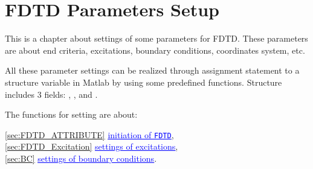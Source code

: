 \chapter{FDTD Parameters Setup}\label{chap:FDTD Parameter Setup}
This is a chapter about settings of some parameters for FDTD. These parameters are about end criteria, excitations, boundary conditions, coordinates system, etc.

All these parameter settings can be realized through assignment statement to a structure variable  in Matlab by using some predefined functions.
Structure   \label{para:FDTD} includes 3 fields:
, \label{para:ATTRIBUTE}
, \label{para:Excitation}
and  \label{para:BoundaryCond}.

The functions for setting  are about:
      \begin{myindentpar}
\ref{sec:FDTD_ATTRIBUTE} \hspace{1cm} \hyperref[sec:FDTD_ATTRIBUTE]{\textcolor{blue}{\underline{initiation of \texttt{FDTD}}}}, \\
\ref{sec:FDTD_Excitation} \hspace{1cm} \hyperref[sec:FDTD_Excitation]{\textcolor{blue}{\underline{settings of excitations}}},\\
\ref{sec:BC} \hspace{1cm} \hyperref[sec:BC]{\textcolor{blue}{\underline{settings of boundary conditions}}}.
       \end{myindentpar}


